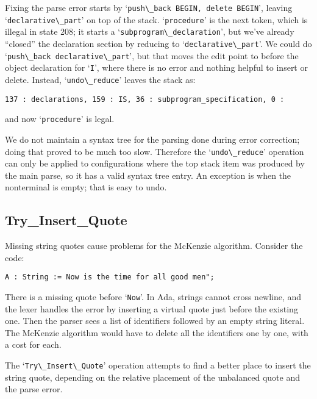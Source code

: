 \documentclass{article}
\newcommand{\code}[1]{`\lstinline|#1|'}
\begin{document}
Fixing the parse error starts by \code{push\_back BEGIN, delete BEGIN},
leaving \code{declarative\_part} on top of the stack. \code{procedure}
is the next token, which is illegal in state 208; it starts a
\code{subprogram\_declaration}, but we've already ``closed'' the
declaration section by reducing to \code{declarative\_part}. We could
do \code{push\_back declarative\_part}, but that moves the edit point to
before the object declaration for \code{I}, where there is no error
and nothing helpful to insert or delete. Instead, \code{undo\_reduce}
leaves the stack as:

\begin{verbatim}
137 : declarations, 159 : IS, 36 : subprogram_specification, 0 :
\end{verbatim}
and now \code{procedure} is legal.

We do not maintain a syntax tree for the parsing done during error
correction; doing that proved to be much too slow. Therefore the
\code{undo\_reduce} operation can only be applied to configurations
where the top stack item was produced by the main parse, so it has a
valid syntax tree entry. An exception is when the nonterminal is
empty; that is easy to undo.

\subsection{Try\_Insert\_Quote}
Missing string quotes cause problems for the McKenzie algorithm.
Consider the code:
\begin{lstlisting}
A : String := Now is the time for all good men";
\end{lstlisting}
There is a missing quote before \code{Now}. In Ada, strings cannot
cross newline, and the lexer handles the error by inserting a virtual
quote just before the existing one. Then the parser sees a list of
identifiers followed by an empty string literal. The McKenzie
algorithm would have to delete all the identifiers one by one, with a
cost for each.

The \code{Try\_Insert\_Quote} operation attempts to find a better
place to insert the string quote, depending on the relative placement
of the unbalanced quote and the parse error.
\end{document}
